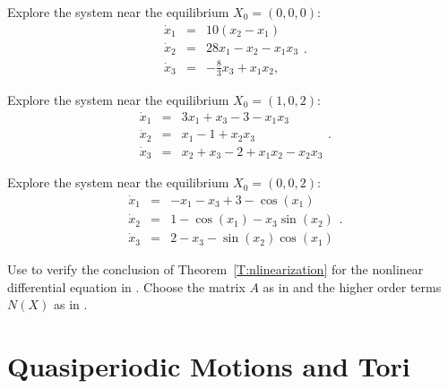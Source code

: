 \documentclass{ximera}
\begin{document}
\begin{exercise} \label{c11.4.1b}
Explore the system  near the equilibrium $X_0 = (0,0,0)$:
\begin{equation*}  \label{e11.4.1b}
\begin{array}{rcl}
\dot{x}_1 & = & 10(x_2-x_1)\\
\dot{x}_2 & = & 28 x_1 - x_2 - x_1x_3\\
\dot{x}_3 & = & -\frac{8}{3} x_3 + x_1x_2,
\end{array}.
\end{equation*}
\end{exercise}

\begin{exercise} \label{c11.4.1c}
Explore the system  near the equilibrium $X_0 = (1,0,2)$:
\begin{equation*}  \label{e11.4.1c}
\begin{array}{rcl}
\dot{x}_1 & = & 3x_1+x_3-3-x_1x_3\\
\dot{x}_2 & = & x_1 - 1 + x_2x_3\\
\dot{x}_3 & = & x_2 + x_3 -2 + x_1 x_2 - x_2 x_3
\end{array}.
\end{equation*}
\end{exercise}

\begin{exercise} \label{c11.4.1d}
Explore the system  near the equilibrium $X_0 = (0,0,2)$:
\begin{equation*}  \label{e11.4.1d}
\begin{array}{rcl}
\dot{x}_1 & = & -x_1-x_3+3-\cos(x_1)\\
\dot{x}_2 & = & 1-\cos(x_1) - x_3\sin(x_2)\\
\dot{x}_3 & = & 2-x_3 - \sin(x_2)\cos(x_1)
\end{array}.
\end{equation*}
\end{exercise}

\begin{exercise} \label{c11.4.7}
Use \Matlab to verify the conclusion of Theorem~\ref{T:nlinearization}
for the nonlinear differential equation in .  Choose
the matrix $A$ as in  and the higher order terms $N(X)$
as in .
\end{exercise}


\section{Quasiperiodic Motions and Tori}
\label{S:NLD}
\end{document}
